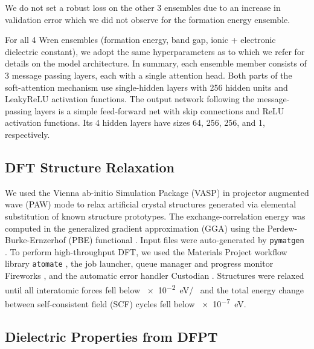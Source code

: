 \documentclass{article}
\newcommand{\A}{\protect\text{Å}} %
\begin{document}
We do not set a robust loss on the other 3 ensembles due to an increase in validation error which we did not observe for the formation energy ensemble.%

For all 4 Wren ensembles (formation energy, band gap, ionic + electronic dielectric constant), we adopt the same hyperparameters as  \cite{goodall_rapid_2022} to which we refer for details on the model architecture. In summary, each ensemble member consists of 3 message passing layers, each with a single attention head.
Both parts of the soft-attention mechanism use single-hidden layers with 256 hidden units and LeakyReLU activation functions. The output network following the message-passing layers is a simple feed-forward net with skip connections and ReLU activation functions. Its 4 hidden layers have sizes 64, 256, 256, and 1, respectively.

\subsection{DFT Structure Relaxation}
\label{sec:dft-structure-relaxation}

We used the Vienna ab-initio Simulation Package (VASP) \cite{kresse_efficiency_1996,kresse_efficient_1996} in projector augmented wave (PAW) mode \cite{blochl_projector_1994} to relax artificial crystal structures generated via elemental substitution of known structure prototypes.
The exchange-correlation energy was computed in the generalized gradient approximation (GGA) \cite{langreth_beyond_1983} using the Perdew-Burke-Ernzerhof (PBE) functional \cite{perdew_rationale_1996}.
Input files were auto-generated by \texttt{pymatgen} \cite{ong_python_2013}.
To perform high-throughput DFT, we used the Materials Project workflow library \texttt{atomate} \cite{mathew_atomate_2017}, the job launcher, queue manager and progress monitor Fireworks \cite{jain_fireworks_2015}, and the automatic error handler Custodian \cite{ong_python_2013}.
Structures were relaxed until all interatomic forces fell below \SI{e-2}{eV/\A} and the total energy change between self-consistent field (SCF) cycles fell below \SI{e-7}{eV}.


\subsection{Dielectric Properties from DFPT}
\label{sec:dfpt-to-dielectric}
\end{document}

